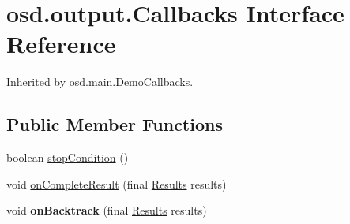 \hypertarget{interfaceosd_1_1output_1_1_callbacks}{\section{osd.\-output.\-Callbacks Interface Reference}
\label{interfaceosd_1_1output_1_1_callbacks}
}


Inherited by osd.\-main.\-Demo\-Callbacks.

\subsection*{Public Member Functions}
\begin{DoxyCompactItemize}
\item 
boolean \hyperlink{interfaceosd_1_1output_1_1_callbacks_a9ddd7287b111fb9ae7b2f8c6f37f5b7c}{stop\-Condition} ()
\item 
void \hyperlink{interfaceosd_1_1output_1_1_callbacks_aee68de08f891ebec0aca383dd2b8a1b5}{on\-Complete\-Result} (final \hyperlink{interfaceosd_1_1output_1_1_results}{Results} results)
\item 
\hypertarget{interfaceosd_1_1output_1_1_callbacks_a60180d47bf100b056467ce6397702b2b}{void {\bfseries on\-Backtrack} (final \hyperlink{interfaceosd_1_1output_1_1_results}{Results} results)}\label{interfaceosd_1_1output_1_1_callbacks_a60180d47bf100b056467ce6397702b2b}

\end{DoxyCompactItemize}



